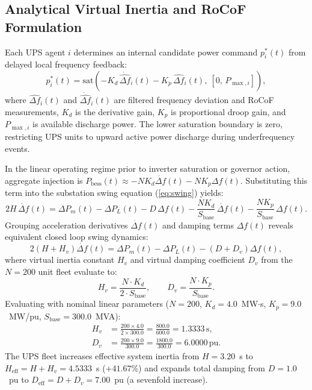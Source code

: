 \documentclass[preprint,12pt]{elsarticle}
\begin{document}
\subsection{Analytical Virtual Inertia and RoCoF Formulation}
\label{sec:inertia}

Each UPS agent $i$ determines an internal candidate power command $p_i^\ast(t)$ from delayed local frequency feedback:
\begin{equation}
p_i^\ast(t) = \mathrm{sat}\!\left(-K_d\,\dot{\widehat{\Delta f}}_i(t) - K_p\,\widehat{\Delta f}_i(t),\ [0,\, P_{\max,i}]\right),
\label{eq:pstar}
\end{equation}
where $\widehat{\Delta f}_i(t)$ and $\dot{\widehat{\Delta f}}_i(t)$ are filtered frequency deviation and RoCoF measurements, $K_d$ is the derivative gain, $K_p$ is proportional droop gain, and $P_{\max,i}$ is available discharge power. The lower saturation boundary is zero, restricting UPS units to upward active power discharge during underfrequency events.

In the linear operating regime prior to inverter saturation or governor action, aggregate injection is $P_{\mathrm{bess}}(t) \approx -N K_d \dot{\Delta f}(t) - N K_p \Delta f(t)$. Substituting this term into the substation swing equation (\ref{eq:swing}) yields:
\begin{equation}
2H\,\dot{\Delta f}(t) = \Delta P_m(t) - \Delta P_L(t) - D\,\Delta f(t) - \frac{N K_d}{S_{\mathrm{base}}}\,\dot{\Delta f}(t) - \frac{N K_p}{S_{\mathrm{base}}}\,\Delta f(t).
\label{eq:swing_expanded}
\end{equation}
Grouping acceleration derivatives $\dot{\Delta f}(t)$ and damping terms $\Delta f(t)$ reveals equivalent closed loop swing dynamics:
\begin{equation}
2\left(H + H_v\right)\dot{\Delta f}(t) = \Delta P_m(t) - \Delta P_L(t) - \left(D + D_v\right)\Delta f(t),
\label{eq:effective_swing}
\end{equation}
where virtual inertia constant $H_v$ and virtual damping coefficient $D_v$ from the $N=200$ unit fleet evaluate to:
\begin{equation}
H_v = \frac{N \cdot K_d}{2 \cdot S_{\mathrm{base}}}, \qquad D_v = \frac{N \cdot K_p}{S_{\mathrm{base}}}.
\label{eq:hv_dv}
\end{equation}
Evaluating with nominal linear parameters ($N=200$, $K_d = 4.0$~MW$\cdot$s, $K_p = 9.0$~MW/pu, $S_{\mathrm{base}} = 300.0$~MVA):
\begin{align}
H_v &= \frac{200 \times 4.0}{2 \times 300.0} = \frac{800.0}{600.0} = 1.3333\,\mathrm{s}, \label{eq:hv_val}\\
D_v &= \frac{200 \times 9.0}{300.0} = \frac{1800.0}{300.0} = 6.0000\,\mathrm{pu}. \label{eq:dv_val}
\end{align}
The UPS fleet increases effective system inertia from $H = 3.20$~s to $H_{\mathrm{eff}} = H + H_v = 4.5333$~s ($+41.67\%$) and expands total damping from $D = 1.0$~pu to $D_{\mathrm{eff}} = D + D_v = 7.00$~pu (a sevenfold increase).
\end{document}
